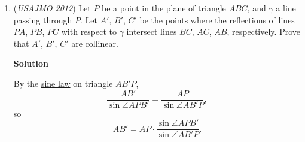 \begin{enumerate}
 
If $k$ is odd, if $k = 503$ or $k = 503 \cdot 3$, then $a \equiv 0 \pmod{4}$ or $a \equiv b \pmod{4}$. Otherwise, $ak \equiv 0 \pmod{2012}$ or $ak \equiv bk \pmod{2012}$, which is impossible to satisfy, given the domain $a, b < 2012$. So, we have $2$ values of $k$.

 
In total, we have $2 + 1005 = 1007$ values of $k$ which makes $r_{a} = r_{b}$ or $r_{a} = 0$, so there are $2011 - 1007 = 1004$ values of $k$ for which $r_{a} \neq r_{b}$ and $r_{a} \neq 0$. Thus, by our reasoning above, our solution is $\frac{1}{2} \cdot 1004 = \boxed{502}$.

 
Solution by $\textbf{\underline{Invoker}}$




\textbf{Solution 3}

The key insight in this problem is noticing that when $ak$ is higher than $bk$, $a(2012-k)$ is lower than $b(2012-k)$, except at $2 \pmod{4}$ residues*. Also, they must be equal many times. $2012=2^2*503$. We should have multiples of $503$. After trying all three pairs and getting $503$ as our answer, we win. But look at the $2\pmod{4}$ idea. What if we just took $2$ and plugged it in with $1006$?We get $502$.

 \begin{verbatim}
--\href{https://artofproblemsolving.com/wiki/index.php?title=User:Va2010&action=edit&redlink=1}{Va2010} 11:12, 28 April 2012 (EDT)va2010
\end{verbatim}





\textbf{Solution 4}

Say that the problem is a race track with $2012$ spots. To intersect the most, we should get next to each other a lot so the negation is high. As $2012=2^2*503$, we intersect at a lot of multiples of $503$.

 


	\item (\textit{USAJMO 2012}) Let $P$ be a point in the plane of triangle $ABC$, and $\gamma$ a line passing through $P$.  Let $A'$, $B'$, $C'$ be the points where the reflections of lines $PA$, $PB$, $PC$ with respect to $\gamma$ intersect lines $BC$, $AC$, $AB$, respectively.  Prove that $A'$, $B'$, $C'$ are collinear.


 



\textbf{Solution}

By the \href{https://artofproblemsolving.com/wiki/index.php?title=Law\_of\_Sines}{sine law} on triangle $AB'P$,
 \[\frac{AB'}{\sin \angle APB'} = \frac{AP}{\sin \angle AB'P},\]so
 \[AB' = AP \cdot \frac{\sin \angle APB'}{\sin \angle AB'P}.\]


\end{enumerate}
